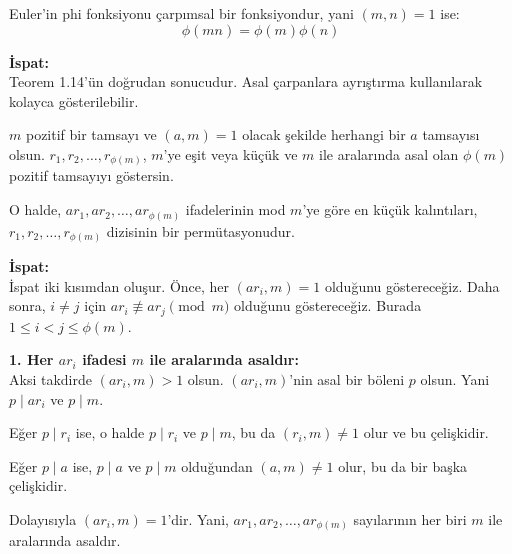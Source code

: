 \documentclass[12pt]{article}
\begin{document}
\vspace{2em}

\begin{tcolorbox}[colback=yellow!5, colframe=yellow!50!black, title=\textbf{Lemma 1.6: Çarpımsal Fonksiyonlar}, fonttitle=\bfseries, sharp corners]
Euler'in phi fonksiyonu çarpımsal bir fonksiyondur, yani $(m,n)=1$ ise:
\[
\phi(mn) = \phi(m)\phi(n)
\]

\textbf{İspat:}\\
Teorem 1.14'ün doğrudan sonucudur. Asal çarpanlara ayrıştırma kullanılarak kolayca gösterilebilir.
\end{tcolorbox}

\vspace{2em}

\begin{tcolorbox}[colback=green!5, colframe=green!40!black, title=\textbf{Lemma 1.6: Permütasyon Özelliği}, fonttitle=\bfseries, sharp corners]
$m$ pozitif bir tamsayı ve $(a, m) = 1$ olacak şekilde herhangi bir $a$ tamsayısı olsun. $r_1, r_2, \ldots, r_{\phi(m)}$, $m$'ye eşit veya küçük ve $m$ ile aralarında asal olan $\phi(m)$ pozitif tamsayıyı göstersin. 

O halde, $ar_1, ar_2, \ldots, ar_{\phi(m)}$ ifadelerinin mod $m$'ye göre en küçük kalıntıları, $r_1, r_2, \ldots, r_{\phi(m)}$ dizisinin bir permütasyonudur.

\vspace{0.5em}

\textbf{İspat:} \\
İspat iki kısımdan oluşur. Önce, her $(ar_i, m) = 1$ olduğunu göstereceğiz. Daha sonra, $i \ne j$ için $ar_i \not\equiv ar_j \pmod{m}$ olduğunu göstereceğiz. Burada $1 \leq i < j \leq \phi(m)$.

\textbf{1. Her $ar_i$ ifadesi $m$ ile aralarında asaldır:} \\
Aksi takdirde $(ar_i, m) > 1$ olsun. $(ar_i, m)$'nin asal bir böleni $p$ olsun. Yani $p \mid ar_i$ ve $p \mid m$.

Eğer $p \mid r_i$ ise, o halde $p \mid r_i$ ve $p \mid m$, bu da $(r_i, m) \ne 1$ olur ve bu çelişkidir. 

Eğer $p \mid a$ ise, $p \mid a$ ve $p \mid m$ olduğundan $(a, m) \ne 1$ olur, bu da bir başka çelişkidir. 

Dolayısıyla $(ar_i, m) = 1$'dir. Yani, $ar_1, ar_2, \ldots, ar_{\phi(m)}$ sayılarının her biri $m$ ile aralarında asaldır.

\vspace{0.5em}


\end{tcolorbox}
\end{document}
